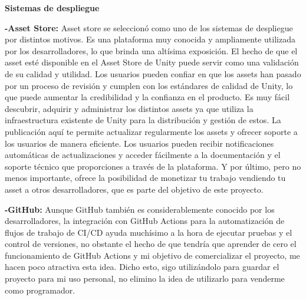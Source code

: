 \textbf{Sistemas de despliegue}

\textbf{-Asset Store:} Asset store se seleccionó como uno de los sistemas de despliegue por distintos motivos. Es una plataforma muy conocida y ampliamente utilizada por los desarrolladores, lo que brinda una altísima exposición. El hecho de que el asset esté disponible en el Asset Store de Unity puede servir como una validación de su calidad y utilidad. Los usuarios pueden confiar en que los assets han pasado por un proceso de revisión y cumplen con los estándares de calidad de Unity, lo que puede aumentar la credibilidad y la confianza en el producto. Es muy fácil descubrir, adquirir y administrar los distintos assets ya que utiliza la infraestructura existente de Unity para la distribución y gestión de estos. La publicación aquí te permite actualizar regularmente los assets y ofrecer soporte a los usuarios de manera eficiente. Los usuarios pueden recibir notificaciones automáticas de actualizaciones y acceder fácilmente a la documentación y el soporte técnico que proporciones a través de la plataforma. Y por último, pero no menos importante, ofrece la posibilidad de monetizar tu trabajo vendiendo tu asset a otros desarrolladores,  que es parte del objetivo de este proyecto.

\textbf{-GitHub:} Aunque GitHub también es considerablemente conocido por los desarrolladores, la integración con GitHub Actions para la automatización de flujos de trabajo de CI/CD ayuda muchísimo a la hora de ejecutar pruebas y el control de versiones, no obstante el hecho de que tendría que aprender de cero el funcionamiento de GitHub Actions y mi objetivo de comercializar el proyecto, me hacen poco atractiva esta idea. Dicho esto, sigo utilizándolo para guardar el proyecto para mi uso personal, no elimino la idea de utilizarlo para venderme como programador.


